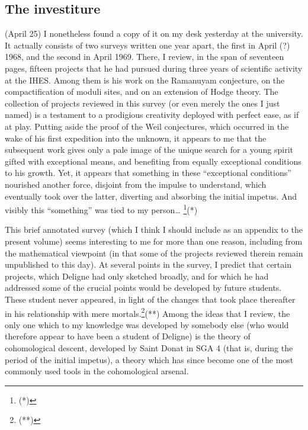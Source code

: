 \subsection{The investiture}

 (April 25) I nonetheless found a copy of it 
on my desk yesterday at the university. It actually consists of two surveys written one
year apart, the first in April (?) 1968, and the second in April 1969.
There, I review, in the span of seventeen pages, fifteen projects that he had pursued
during three years of scientific activity at the IHES.
Among them is his work on the Ramanuyam conjecture, on the compactification of moduli
sites, and on an extension of Hodge theory.
The collection of projects reviewed in this survey 
(or even merely the ones I just named)
is a testament to a prodigious creativity deployed with perfect ease, as if at play.
Putting aside the proof of the Weil conjectures, which occurred in the wake of his first
expedition into the unknown, it appears to me that the  subsequent work gives only a pale
image of the unique search for a young spirit gifted with exceptional means, and
benefiting from equally exceptional conditions to his growth. 
Yet, it appears that something in these ``exceptional conditions''
nourished another force, disjoint from the impulse to understand, which eventually 
took over the latter,  diverting and absorbing the initial impetus. 
And visibly this ``something'' was tied to my person\ldots 
\footnote{(*)}(*)

This brief annotated survey (which I think I should include as an appendix to the present
volume) seems interesting to me for more than one reason, including from the mathematical
viewpoint (in that  some of the projects reviewed therein remain unpublished to this day).
At several points in the survey, I predict that certain projects, which Deligne had only
sketched broadly, and for which he had addressed some of the crucial points would
be developed by future students. These student never appeared, in light of the changes
that took place thereafter in his relationship with mere mortals.\footnote{(**)}(**)
Among the ideas that I review, the only one
which to my knowledge was developed by somebody else (who would therefore appear to have
been a student of Deligne) is the theory of cohomological descent, developed 
by Saint Donat in SGA 4 (that is, during the period of the initial impetus),
a theory which has since become one of the most commonly used tools in the cohomological
arsenal. 

